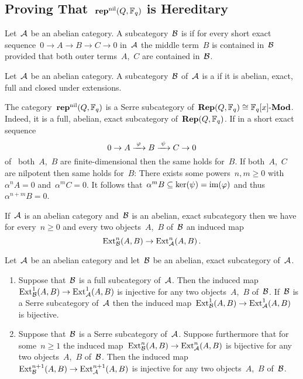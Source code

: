 \documentclass[a4paper, 11pt, twoside=semi]{scrartcl}
\begin{document}
\subsection{Proving That~$\mathbf{rep}^{\mathrm{nil}}(Q, \mathbb{F}_q)$ is Hereditary}
\label{proof of repnil is hereditary}

\begin{definition}
  Let~$\mathcal{A}$ be an abelian category.
  A subcategory~$\mathcal{B}$ is  if for every short exact sequence~$0 \to A \to B \to C \to 0$ in~$\mathcal{A}$ the middle term~$B$ is contained in~$\mathcal{B}$ provided that both outer terms~$A$,~$C$ are contained in~$\mathcal{B}$.
\end{definition}

\begin{definition}
  Let~$\mathcal{A}$ be an abelian category.
  A subcategory~$\mathcal{B}$ of~$\mathcal{A}$ is a  if it is abelian, exact, full and closed under extensions.
\end{definition}

\begin{example}
  \label{repnil is a serre subcategory}
  The category~$\mathbf{rep}^{\mathrm{nil}}(Q, \mathbb{F}_q)$ is a Serre subcategory of~$\mathbf{Rep}(Q, \mathbb{F}_q) \cong \mathbb{F}_q[x]\textrm{-}\mathbf{Mod}$.
  Indeed, it is a full, abelian, exact subcategory of~$\mathbf{Rep}(Q, \mathbb{F}_q)$.
  If in a short exact sequence
  \[
    0
    \to
    A
    \xrightarrow{\; \varphi \;}
    B
    \xrightarrow{\; \psi \;}
    C
    \to
    0
  \]
  of~ both~$A$,~$B$ are finite-dimensional then the same holds for~$B$.
  If both~$A$,~$C$ are nilpotent then same holds for~$B$:
  There exists some powers~$n, m \geq 0$ with~$\alpha^n A = 0$ and~$\alpha^m C = 0$.
  It follows that~$\alpha^m B \subseteq \ker(\psi) = \operatorname{im}(\varphi)$ and thus~$\alpha^{n+m} B = 0$.
\end{example}

If~$\mathcal{A}$ is an abelian category and~$\mathcal{B}$ is an abelian, exact subcategory then we have for every~$n \geq 0$ and every two objects~$A$,~$B$ of~$\mathcal{B}$ an induced map
\[
  \operatorname{Ext}^n_{\mathcal{B}}(A,B)
  \to
  \operatorname{Ext}^n_{\mathcal{A}}(A,B) \,.
\]

\begin{proposition}
  \label{ext for serre subcategories}
  Let~$\mathcal{A}$ be an abelian category and let~$\mathcal{B}$ be an abelian, exact subcategory of~$\mathcal{A}$.
  \begin{enumerate}
    \item
      Suppose that~$\mathcal{B}$ is a full subcategory of~$\mathcal{A}$.
      Then the induced map~$\operatorname{Ext}^1_{\mathcal{B}}(A,B) \to \operatorname{Ext}^1_{\mathcal{A}}(A,B)$ is injective for any two objects~$A$,~$B$ of~$\mathcal{B}$.
      If~$\mathcal{B}$ is a Serre subcategory of~$\mathcal{A}$ then the induced map~$\operatorname{Ext}^1_{\mathcal{B}}(A,B) \to \operatorname{Ext}^1_{\mathcal{A}}(A,B)$ is bijective.
    \item
      Suppose that~$\mathcal{B}$ is a Serre subcategory of~$\mathcal{A}$.
      Suppose furthermore that for some~$n \geq 1$ the induced map~$\operatorname{Ext}^n_{\mathcal{B}}(A,B) \to \operatorname{Ext}^n_{\mathcal{A}}(A,B)$ is bijective for any two objects~$A$,~$B$ of~$\mathcal{B}$.
      Then the induced map~$\operatorname{Ext}^{n+1}_{\mathcal{B}}(A,B) \to \operatorname{Ext}^{n+1}_{\mathcal{A}}(A,B)$ is injective for any two objects~$A$,~$B$ of~$\mathcal{B}$. 
  \end{enumerate}
\end{proposition}
\end{document}
